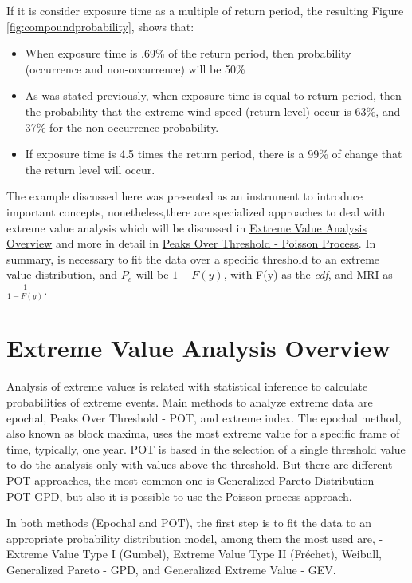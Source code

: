 \documentclass[12pt,oneside]{reedthesis}
\providecommand{\tightlist}{%
  \setlength{\itemsep}{0pt}\setlength{\parskip}{0pt}}
\begin{document}
If it is consider exposure time as a multiple of return period, the resulting Figure \ref{fig:compoundprobability}, shows that:
\begin{itemize}
\tightlist
\item
  When exposure time is .69\% of the return period, then probability (occurrence and non-occurrence) will be 50\%
\item
  As was stated previously, when exposure time is equal to return period, then the probability that the extreme wind speed (return level) occur is 63\%, and 37\% for the non occurrence probability.
\item
  If exposure time is 4.5 times the return period, there is a 99\% of change that the return level will occur.
\end{itemize}
The example discussed here was presented as an instrument to introduce important concepts, nonetheless,there are specialized approaches to deal with extreme value analysis which will be discussed in \protect\hyperlink{extremeoverview}{Extreme Value Analysis Overview} and more in detail in \protect\hyperlink{pot-pp}{Peaks Over Threshold - Poisson Process}. In summary, is necessary to fit the data over a specific threshold to an extreme value distribution, and \(P_e\) will be \(1-F(y)\), with F(y) as the \emph{cdf}, and MRI as \(\frac{1}{1-F(y)}\).

\hypertarget{extremeoverview}{%
\section{Extreme Value Analysis Overview}\label{extremeoverview}}

Analysis of extreme values is related with statistical inference to calculate probabilities of extreme events. Main methods to analyze extreme data are epochal, Peaks Over Threshold - POT, and extreme index. The epochal method, also known as block maxima, uses the most extreme value for a specific frame of time, typically, one year. POT is based in the selection of a single threshold value to do the analysis only with values above the threshold. But there are different POT approaches, the most common one is Generalized Pareto Distribution - POT-GPD, but also it is possible to use the Poisson process approach.

In both methods (Epochal and POT), the first step is to fit the data to an appropriate probability distribution model, among them the most used are, - Extreme Value Type I (Gumbel), Extreme Value Type II (Fréchet), Weibull, Generalized Pareto - GPD, and Generalized Extreme Value - GEV.
\end{document}
